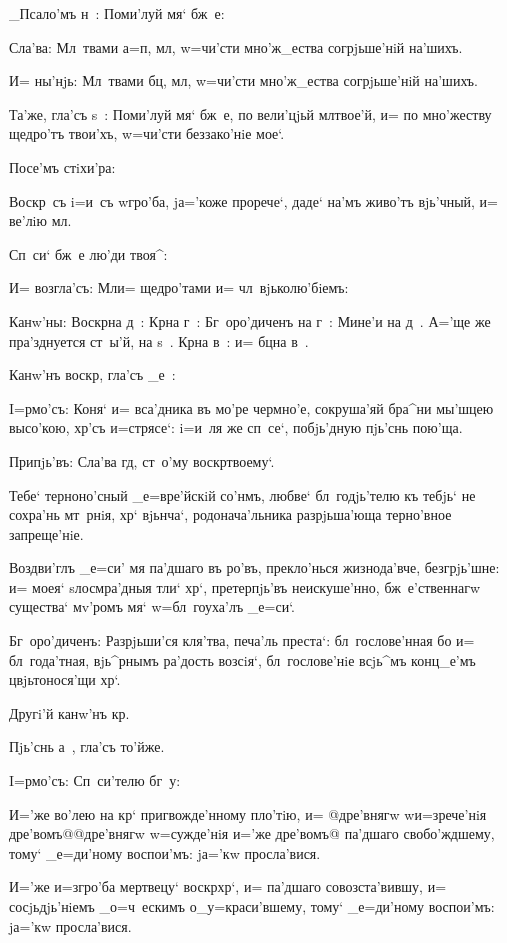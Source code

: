 _Псало'мъ н~: Поми'луй мя` бж~е:

Сла'ва: Мл~твами а=п, мл, w=чи'сти 
мно'ж_ества согрjьше'нiй на'шихъ. 

И= ны'нjь: Мл~твами бц, мл, w=чи'сти 
мно'ж_ества согрjьше'нiй на'шихъ.

Та'же, гла'съ s~: Поми'луй мя` бж~е, по вели'цjьй 
мл твое'й, и= по мно'жеству щедро'тъ твои'хъ, 
w=чи'сти беззако'нiе мое`.

Посе'мъ стiхи'ра: 

Воскр~съ i=и~съ w\т гро'ба, jа='коже прорече`, даде` 
на'мъ живо'тъ вjь'чный, и= ве'лiю мл. 

Сп~си` бж~е лю'ди твоя^:

И= возгла'съ: Мл и= щедро'тами и= 
чл~вjьколю'бiемъ: 

Канw'ны: Воскр на д~: Кр на г~: 
Бг~оро'диченъ на г~: Мине'и на д~. А='ще же пра'зднуется 
ст~ы'й, на s~. Кр на в~: и= бц на в~.

Канw'нъ воскр, гла'съ _е~:


I=рмо'съ: Коня` и= вса'дника въ мо'ре чермно'е, 
сокруша'яй бра^ни мы'шцею высо'кою, хр'съ и=стрясе`: 
i=и~ля же сп~се`, побjь'дную пjь'снь пою'ща.

Припjь'въ: Сла'ва гд, ст~о'му воскр твоему`. 

Тебе` терноно'сный _е=вре'йскiй со'нмъ, любве` 
бл~годjь'телю къ тебjь` не сохра'нь мт~рнiя, хр` 
вjьнча`, родонача'льника разрjьша'юща терно'вное 
запреще'нiе.

Воздви'глъ _е=си' мя па'дшаго въ ро'въ, прекло'нься 
жизнода'вче, безгрjь'шне: и= моея` sлосмра'дныя тли` 
хр`, претерпjь'въ неискуше'нно, бж~е'ственнагw 
существа` мv'ромъ мя` w=бл~гоуха'лъ _е=си`.

Бг~оро'диченъ: Разрjьши'ся кля'тва, печа'ль преста`: 
бл~гослове'нная бо и= бл~года'тная, вjь^рнымъ ра'дость 
возсiя`, бл~гослове'нiе всjь^мъ конц_е'мъ цвjьтонося'щи 
хр`.

Другi'й канw'нъ кр. 

Пjь'снь а~, гла'съ то'йже.

I=рмо'съ: Сп~си'телю бг~у:

И='же во'лею на кр` пригвожде'нному пло'тiю, и= 
@дре'внягw w\т и=зрече'нiя дре'вомъ@{@дре'внягw 
w=сужде'нiя и='же дре'вомъ@} па'дшаго свобо'ждшему, тому` 
_е=ди'ному воспои'мъ: jа='кw просла'вися.

И='же и=з\ъ гро'ба мертвецу` воскр хр`, и= 
па'дшаго совозста'вившу, и= сосjьдjь'нiемъ _о=ч~ескимъ 
о_у=краси'вшему, тому` _е=ди'ному воспои'мъ: jа='кw 
просла'вися.

